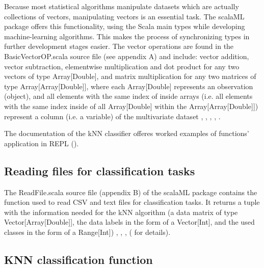 \documentclass[twoside, 11 p]{article}
\begin{document}
Because most statistical algorithms manipulate datasets which are actually collections of vectors, manipulating vectors is an essential task. The scalaML package offers this functionality, using the Scala main types while developing machine-learning algorithms. This makes the process of synchronizing types in further development stages easier.
 The vector operations are found in the BasicVectorOP.scala source file (see appendix A) and include: vector addition, vector subtraction, elementwise multiplication and dot product for any two vectors of type Array[Double], and matrix multiplication for any two matrices of type Array[Array[Double]], where each Array[Double] represents an observation (object), and all elements with the same index of inside arrays (i.e. all elements with the same index inside of all Array[Double] within the Array[Array[Double]]) represent a column (i.e. a variable) of the multivariate dataset \citep{dawkins_pauls_2005}, \citep{odersky_programming_2010}, \citep{swartz_learning_2015}, \citep{trask_grokking_2017}, \citep{noauthor_scala_2003}.

The documentation of the kNN classifier offeres worked examples of functions' application in REPL (\citep[see]{tesileanu_introduction_2017}).

\subsection{Reading files for classification tasks}

The ReadFile.scala source file (appendix B) of the scalaML package contains the function used to read CSV and text files for classification tasks. It returns a tuple with the information needed for the kNN algorithm (a data matrix of type Vector[Array[Double]], the data labels in the form of a Vector[Int],  and the used classes in the form of a Range[Int]) \citep{harrington_machine_2012}, \citep{odersky_programming_2010}, \citep{swartz_learning_2015}, \citep{noauthor_scala_2003} (\citep[see]{tesileanu_introduction_2017} for details).
 
\subsection{KNN classification function}
\end{document}
